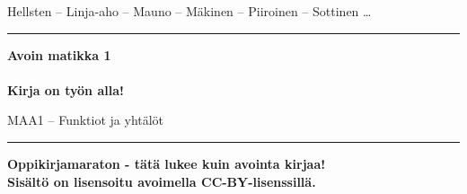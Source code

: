 
\begin{center}
    \begin{doublespace}
        \begin{LARGE}
            \textrm{Hellsten -- Linja-aho -- Mauno -- Mäkinen -- Piiroinen -- Sottinen \ldots} \\
        \end{LARGE}
      
        \vspace{0.5cm}
        \hrule height 2pt
        \vspace{1cm}
        \begin{Huge}
            \textbf{\textrm{Avoin matikka 1}\\\ \\Kirja on työn alla!}
        \end{Huge}
      
        \vfill
      
        \begin{huge}
            \textrm{MAA1 -- Funktiot ja yhtälöt}
        \end{huge}
        \vspace{1cm}
        \hrule height 2pt
    \end{doublespace}
\end{center}

\vfill

\begin{flushright}
    \textbf{
        Oppikirjamaraton - tätä lukee kuin avointa kirjaa! \\
        Sisältö on lisensoitu avoimella CC-BY-lisenssillä. \\
    }
\end{flushright}